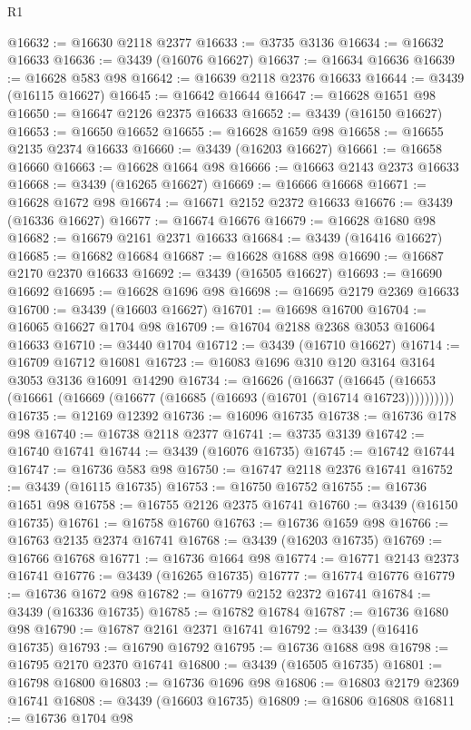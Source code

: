\begin{lexlean}{R1}
\begin{coremodule}
@16632 := @16630 @2118 @2377
@16633 := @3735 @3136
@16634 := @16632 @16633
@16636 := @3439 (@16076 @16627)
@16637 := @16634 @16636
@16639 := @16628 @583 @98
@16642 := @16639 @2118 @2376 @16633
@16644 := @3439 (@16115 @16627)
@16645 := @16642 @16644
@16647 := @16628 @1651 @98
@16650 := @16647 @2126 @2375 @16633
@16652 := @3439 (@16150 @16627)
@16653 := @16650 @16652
@16655 := @16628 @1659 @98
@16658 := @16655 @2135 @2374 @16633
@16660 := @3439 (@16203 @16627)
@16661 := @16658 @16660
@16663 := @16628 @1664 @98
@16666 := @16663 @2143 @2373 @16633
@16668 := @3439 (@16265 @16627)
@16669 := @16666 @16668
@16671 := @16628 @1672 @98
@16674 := @16671 @2152 @2372 @16633
@16676 := @3439 (@16336 @16627)
@16677 := @16674 @16676
@16679 := @16628 @1680 @98
@16682 := @16679 @2161 @2371 @16633
@16684 := @3439 (@16416 @16627)
@16685 := @16682 @16684
@16687 := @16628 @1688 @98
@16690 := @16687 @2170 @2370 @16633
@16692 := @3439 (@16505 @16627)
@16693 := @16690 @16692
@16695 := @16628 @1696 @98
@16698 := @16695 @2179 @2369 @16633
@16700 := @3439 (@16603 @16627)
@16701 := @16698 @16700
@16704 := @16065 @16627 @1704 @98
@16709 := @16704 @2188 @2368 @3053 @16064 @16633
@16710 := @3440 @1704
@16712 := @3439 (@16710 @16627)
@16714 := @16709 @16712 @16081
@16723 := @16083 @1696 @310 @120 @3164 @3164 @3053 @3136 @16091 @14290
@16734 := @16626
    (@16637 (@16645 (@16653 (@16661 (@16669 (@16677 (@16685 (@16693 (@16701 (@16714 @16723))))))))))
@16735 := @12169 @12392
@16736 := @16096 @16735
@16738 := @16736 @178 @98
@16740 := @16738 @2118 @2377
@16741 := @3735 @3139
@16742 := @16740 @16741
@16744 := @3439 (@16076 @16735)
@16745 := @16742 @16744
@16747 := @16736 @583 @98
@16750 := @16747 @2118 @2376 @16741
@16752 := @3439 (@16115 @16735)
@16753 := @16750 @16752
@16755 := @16736 @1651 @98
@16758 := @16755 @2126 @2375 @16741
@16760 := @3439 (@16150 @16735)
@16761 := @16758 @16760
@16763 := @16736 @1659 @98
@16766 := @16763 @2135 @2374 @16741
@16768 := @3439 (@16203 @16735)
@16769 := @16766 @16768
@16771 := @16736 @1664 @98
@16774 := @16771 @2143 @2373 @16741
@16776 := @3439 (@16265 @16735)
@16777 := @16774 @16776
@16779 := @16736 @1672 @98
@16782 := @16779 @2152 @2372 @16741
@16784 := @3439 (@16336 @16735)
@16785 := @16782 @16784
@16787 := @16736 @1680 @98
@16790 := @16787 @2161 @2371 @16741
@16792 := @3439 (@16416 @16735)
@16793 := @16790 @16792
@16795 := @16736 @1688 @98
@16798 := @16795 @2170 @2370 @16741
@16800 := @3439 (@16505 @16735)
@16801 := @16798 @16800
@16803 := @16736 @1696 @98
@16806 := @16803 @2179 @2369 @16741
@16808 := @3439 (@16603 @16735)
@16809 := @16806 @16808
@16811 := @16736 @1704 @98

\end{coremodule}
\end{lexlean}
